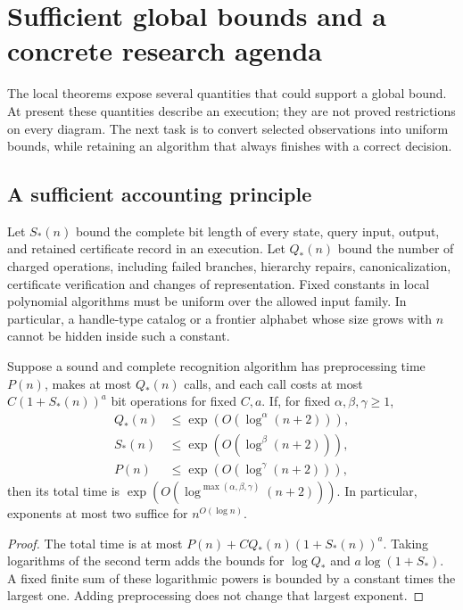\section{Sufficient global bounds and a concrete research agenda}
\label{sec:global-agenda}

The local theorems expose several quantities that could support a global
bound. At present these quantities describe an execution; they are not
proved restrictions on every diagram. The next task is to convert selected
observations into uniform bounds, while retaining an algorithm that always
finishes with a correct decision.

\subsection{A sufficient accounting principle}

Let $S_*(n)$ bound the complete bit length of every state, query input,
output, and retained certificate record in an execution. Let $Q_*(n)$ bound
the number of charged operations, including failed branches, hierarchy
repairs, canonicalization, certificate verification and changes of
representation. Fixed constants in local polynomial algorithms must be
uniform over the allowed input family. In particular, a handle-type catalog
or a frontier alphabet whose size grows with $n$ cannot be hidden inside
such a constant.

\begin{proposition}
\label{prop:global-accounting}
Suppose a sound and complete recognition algorithm has preprocessing time
$P(n)$, makes at most $Q_*(n)$ calls, and each call costs at most
$C(1+S_*(n))^a$ bit operations for fixed $C,a$. If, for fixed
$\alpha,\beta,\gamma\ge1$,
\[
\begin{split}
 Q_*(n)&\le\exp(O(\log^{\alpha}(n+2))),\\
 S_*(n)&\le\exp(O(\log^{\beta}(n+2))),\\
 P(n)&\le\exp(O(\log^{\gamma}(n+2))),
\end{split}
\]
then its total time is
$\exp(O(\log^{\max(\alpha,\beta,\gamma)}(n+2)))$.
In particular, exponents at most two suffice for $n^{O(\log n)}$.
\end{proposition}

\begin{proof}
The total time is at most $P(n)+C Q_*(n)(1+S_*(n))^a$.
Taking logarithms of the second term adds the bounds for $\log Q_*$
and $a\log(1+S_*)$. A fixed finite sum of these logarithmic powers is
bounded by a constant times the largest one. Adding preprocessing does
not change that largest exponent.
\end{proof}


